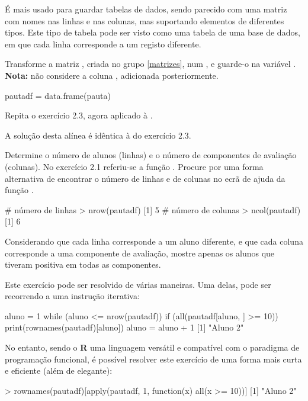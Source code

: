 \documentclass{exam}
\begin{document}
É mais usado para guardar tabelas de dados, sendo parecido com uma matriz com nomes nas linhas e nas colunas, mas suportando elementos de diferentes tipos. Este tipo de tabela pode ser visto como uma tabela de uma base de dados, em que cada linha corresponde a um registo diferente.

\begin{questions}
\question Transforme a matriz , criada no grupo \ref{matrizes}, num , e guarde-o na variável . \textbf{Nota:} não considere a coluna , adicionada posteriormente.

\begin{solution}
	\begin{rcode}
		pautadf = data.frame(pauta)
	\end{rcode}
\end{solution}

\question Repita o exercício 2.3, agora aplicado à .

\begin{solution}
	A solução desta alínea é idêntica à do exercício 2.3.
\end{solution}

\question Determine o número de alunos (linhas) e o número de componentes de avaliação (colunas). No exercício 2.1 referiu-se a função . Procure por uma forma alternativa de encontrar o número de linhas e de colunas no ecrã de ajuda da função .

\begin{solution}
	\begin{rcode}
		# número de linhas
		> nrow(pautadf)
		[1] 5
		# número de colunas
		> ncol(pautadf)
		[1] 6
	\end{rcode}
\end{solution}

\question Considerando que cada linha corresponde a um aluno diferente, e que cada coluna corresponde a uma componente de avaliação, mostre apenas os alunos que tiveram positiva em todas as componentes.

\begin{solution}
	Este exercício pode ser resolvido de várias maneiras. Uma delas, pode ser recorrendo a uma instrução iterativa:
	\begin{rcode}
		aluno = 1
		while (aluno <= nrow(pautadf)) {
		  if (all(pautadf[aluno, ] >= 10)) {
		    print(rownames(pautadf)[aluno])
		  }
		  aluno = aluno + 1
		}
		[1] "Aluno 2"
	\end{rcode}
	No entanto, sendo o \textbf{R} uma linguagem versátil e compatível com o paradigma de programação funcional, é possível resolver este exercício de uma forma mais curta e eficiente (além de elegante):
	\begin{rcode}
		> rownames(pautadf)[apply(pautadf, 1, function(x) all(x >= 10))]
		[1] "Aluno 2"
	\end{rcode}
\end{solution}


\end{questions}
\end{document}
